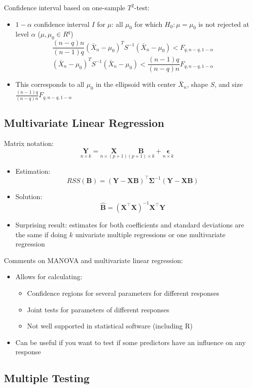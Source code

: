 \documentclass[a4paper]{article}
\begin{document}
Confidence interval based on one-sample $T^2$-test:
\begin{itemize}
    \item $1-\alpha$ confidence interval $I$ for $\mu$: all $\mu_0$ for which $H_0:\mu=\mu_0$ is not rejected at level $\alpha$ ($\mu,\mu_0\in R^q$)
    \[\frac{(n-q)n}{(n-1)q}(\bar{X}_n-\mu_0)^TS^{-1}(\bar{X}_n-\mu_0)< F_{q,n-q,1-\alpha} \]
    \[(\bar{X}_n-\mu_0)^TS^{-1}(\bar{X}_n-\mu_0)<\frac{(n-1)q}{(n-q)n}F_{q,n-q,1-\alpha} \]
    \item This corresponds to all $\mu_0$ in the ellipsoid with center $\bar{X}_n$, shape $S$, and size $\frac{(n-1)q}{(n-q)n}F_{q,n-q,1-\alpha}$
\end{itemize}

\subsection{Multivariate Linear Regression}

Matrix notation:
\[\underset{n\times k}{\mathbf{Y}}=\underset{n\times(p+1)}{\mathbf{X}}\underset{(p+1)\times k}{\mathbf{B}}+\underset{n\times k}{\boldsymbol{\epsilon}} \]
\begin{itemize}
    \item Estimation:
    \[RSS(\mathbf{B})=(\mathbf{Y}-\mathbf{X}\mathbf{B})^{\intercal}\boldsymbol{\Sigma}^{-1}(\mathbf{Y}-\mathbf{X}\mathbf{B}) \]
    \item Solution:
    \[\hat{\mathbf{B}}=(\mathbf{X}^{\intercal}\mathbf{X})^{-1}\mathbf{X}^{\intercal}\mathbf{Y} \]
    \item Surprising result: estimates for both coefficients and standard deviations are the same if doing $k$ univariate multiple regressions or one multivariate regression
\end{itemize}

Comments on MANOVA and multivariate linear regression:
\begin{itemize}
    \item Allows for calculating:
    \begin{itemize}
        \item Confidence regions for several parameters for different responses
        \item Joint tests for parameters of different responses
        \item Not well supported in statistical software (including R)
    \end{itemize}
    \item Can be useful if you want to test if some predictors have an influence on any response
\end{itemize}

\subsection{Multiple Testing}
\end{document}
